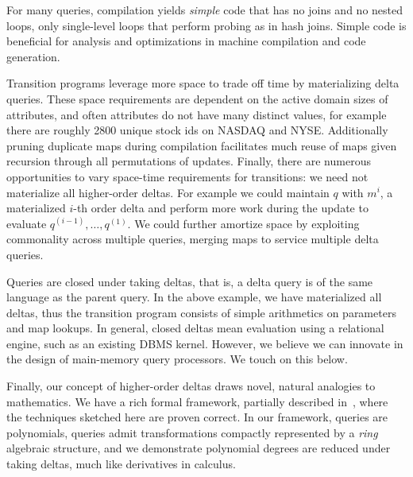 For many queries, compilation yields \textit{simple} code that has no joins
and no nested loops, only single-level loops that perform probing as
in hash joins.
Simple code is beneficial for analysis and optimizations in machine
compilation and code generation.

Transition programs leverage more space to trade off time by materializing delta
queries. These space requirements are dependent on the active domain sizes of
attributes, and often attributes do not have many distinct values, for example
there are roughly 2800 unique stock ids on NASDAQ and NYSE. Additionally pruning
duplicate maps during compilation facilitates much reuse of maps given recursion
through all permutations of updates. Finally, there are numerous opportunities
to vary space-time requirements for transitions: we need not materialize all
higher-order deltas. For example we could maintain $q$ with $m^i$, a
materialized $i$-th order delta and perform more work during the update to
evaluate $q^{(i-1)}, \ldots, q^{(1)}$. We could further amortize space by
exploiting commonality across multiple queries, merging maps to service multiple delta
queries.



Queries are closed under taking deltas, that is, a delta query is of the same
language as the parent query. In the above example, we have materialized all
deltas, thus the transition program consists of simple arithmetics on parameters
and map lookups. In general, closed deltas mean evaluation using a relational
engine, such as an existing DBMS kernel. However, we believe we can innovate in
the design of main-memory query processors. We touch on this below.

Finally, our concept of higher-order deltas draws novel, natural analogies to
mathematics. We have a rich formal framework, partially described
in~\cite{koch-pods:10}, where the techniques sketched here are proven correct.
In our framework, queries are polynomials, queries admit transformations
compactly represented by a \textit{ring} algebraic structure, and we demonstrate
polynomial degrees are reduced under taking deltas, much like derivatives in
calculus.

